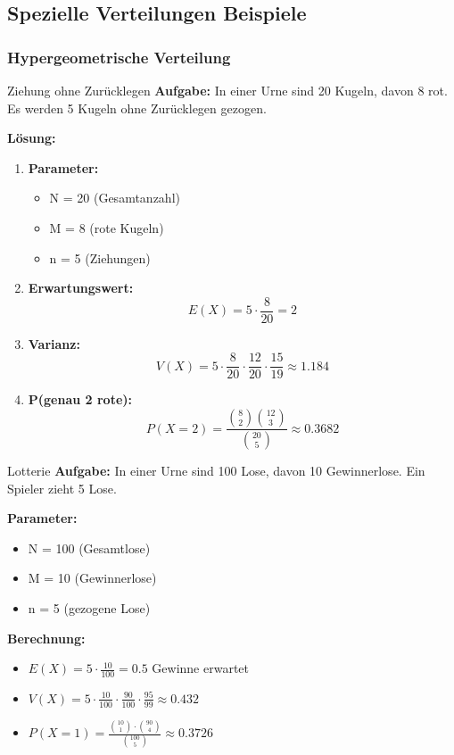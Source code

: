 \subsection{Spezielle Verteilungen Beispiele}

\subsubsection{Hypergeometrische Verteilung}

\begin{example2}{Ziehung ohne Zurücklegen}
\textbf{Aufgabe:} In einer Urne sind 20 Kugeln, davon 8 rot. Es werden 5 Kugeln ohne Zurücklegen gezogen. 

\textbf{Lösung:}
\begin{enumerate}
\item \textbf{Parameter:}
   \begin{itemize}
   \item N = 20 (Gesamtanzahl)
   \item M = 8 (rote Kugeln)
   \item n = 5 (Ziehungen)
   \end{itemize}

\item \textbf{Erwartungswert:}
   $$E(X) = 5 \cdot \frac{8}{20} = 2$$

\item \textbf{Varianz:}
   $$V(X) = 5 \cdot \frac{8}{20} \cdot \frac{12}{20} \cdot \frac{15}{19} \approx 1.184$$

\item \textbf{P(genau 2 rote):}
   $$P(X=2) = \frac{\binom{8}{2}\binom{12}{3}}{\binom{20}{5}} \approx 0.3682$$
\end{enumerate}
\end{example2}

\begin{example2}{Lotterie}
\textbf{Aufgabe:} In einer Urne sind 100 Lose, davon 10 Gewinnerlose. Ein Spieler zieht 5 Lose.

\textbf{Parameter:}
\begin{itemize}
\item N = 100 (Gesamtlose)
\item M = 10 (Gewinnerlose)
\item n = 5 (gezogene Lose)
\end{itemize}

\textbf{Berechnung:}
\begin{itemize}
\item $E(X) = 5 \cdot \frac{10}{100} = 0.5$ Gewinne erwartet
\item $V(X) = 5 \cdot \frac{10}{100} \cdot \frac{90}{100} \cdot \frac{95}{99} \approx 0.432$
\item $P(X=1) = \frac{\binom{10}{1} \cdot \binom{90}{4}}{\binom{100}{5}} \approx 0.3726$
\end{itemize}
\end{example2}

